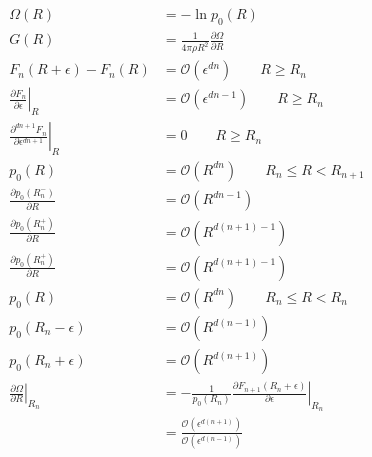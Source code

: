 \documentclass[12pt]{report}
\begin{document}
\begin{subequations}
  \begin{align}
    \Omega(R) &= - \ln{p_0(R)} \\
    G(R) &=
    \frac{1}{4\pi \rho R^2}
    \frac{\partial \Omega}{\partial R} \\
    F_n(R + \epsilon) - F_n(R) &=
    \mathcal{O}(\epsilon^{dn})
    \qquad R \ge R_n \\
    \left. \frac{\partial F_n}{\partial \epsilon} \right|_R &=
    \mathcal{O}(\epsilon^{dn-1})
    \qquad R \ge R_n \\
    \left. \frac{\partial^{dn+1} F_n}{\partial \epsilon^{dn+1}} \right|_R &=
    0
    \qquad R \ge R_n \\
    p_0(R) &= \mathcal{O}(R^{dn}) \qquad R_n \le R < R_{n+1} \\
    \frac{\partial p_0(R_n^-)}{\partial R} &=
    \mathcal{O}(R^{dn-1}) \\
    \frac{\partial p_0(R_n^+)}{\partial R} &=
    \mathcal{O}(R^{d(n+1)-1}) \\
    \frac{\partial p_0(R_n^+)}{\partial R} &=
    \mathcal{O}(R^{d(n+1)-1}) \\
    p_0(R) &= \mathcal{O}(R^{dn}) \qquad R_n \le R < R_n \\
    p_0(R_n - \epsilon) &= \mathcal{O}(R^{d(n-1)}) \\
    p_0(R_n + \epsilon) &= \mathcal{O}(R^{d(n+1)}) \\
    \left. \frac{\partial \Omega}{\partial R} \right|_{R_n} &=
    -\frac{1}{p_0(R_n)}
    \left. \frac{\partial F_{n+1}(R_n + \epsilon)}{\partial \epsilon} \right|_{R_n}
    \\
    &=
    \frac{\mathcal{O}(\epsilon^{d(n+1)})}{\mathcal{O}(\epsilon^{d(n-1)})}
  \end{align}
\end{subequations}
\end{document}
